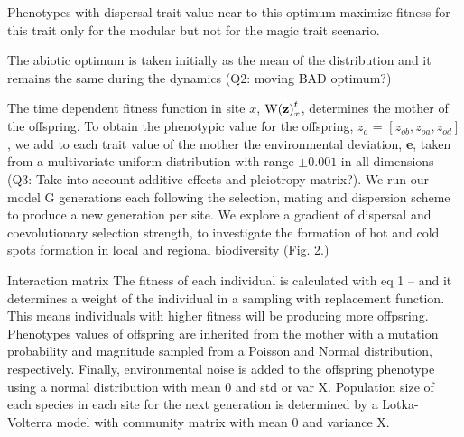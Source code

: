 \documentclass[authoryear,1p,12pt]{elsarticle}
\begin{document}
\begin{mybox}
\begin{singlespace}
\begin{small}
Phenotypes with dispersal trait
value near to this optimum maximize fitness for this trait only for
the modular but not for the magic trait scenario.


The abiotic optimum
is taken initially as the mean of the distribution and it remains the
same during the dynamics (Q2: moving BAD optimum?)

The time dependent fitness function in site $x$,
$\mathrm{W({\bf z})}^{t}_{x}$, determines the mother of the
offspring. To obtain the phenotypic value for the offspring, {\bf
  $z_o$} = $[z_{ob}, z_{oa}, z_{od}]$, we add to each trait value of
the mother the environmental deviation, {\bf e}, taken from a
multivariate uniform distribution with range $\pm0.001$ in all
dimensions (Q3: Take into account additive effects and pleiotropy
matrix?). We run our model G generations each following the selection,
mating and dispersion scheme to produce a new generation per site. We
explore a gradient of dispersal and coevolutionary selection strength,
to investigate the formation of hot and cold spots formation in local
and regional biodiversity (Fig. 2.)

Interaction matrix The fitness of each individual is calculated with
eq 1 -- and it determines a weight of the individual in a sampling
with replacement function. This means individuals with higher fitness
will be producing more offpsring. Phenotypes values of offspring are
inherited from the mother with a mutation probability and magnitude
sampled from a Poisson and Normal distribution, respectively. Finally,
environmental noise is added to the offspring phenotype using a normal
distribution with mean 0 and std or var X. Population size of each
species in each site for the next generation is determined by a
Lotka-Volterra model with community matrix with mean 0 and variance X.





 \end{small}
\end{singlespace}
\end{mybox}

\newpage


\end{document}
